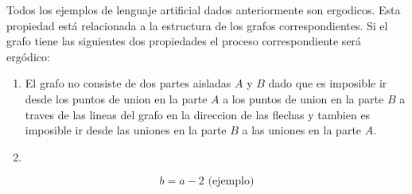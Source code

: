 Todos los ejemplos de lenguaje artificial dados anteriormente son
ergodicos. Esta propiedad est\'{a} relacionada a la estructura de los
grafos correspondientes. Si el grafo tiene las siguientes dos
propiedades el proceso correspondiente ser\'{a} erg\'{o}dico:

\begin{enumerate}
   \item El grafo no consiste de dos partes aisladas $A$ y $B$ dado que es
   imposible ir desde los puntos de union en la parte $A$ a los puntos
   de union en la parte $B$ a traves de las lineas del grafo en la
   direccion de las flechas y tambien es imposible ir desde las
   uniones en la parte $B$ a las uniones en la parte $A$.  \item
\end{enumerate}

\begin{equation}
b = a - 2 \text{ (ejemplo)}
\end{equation}
